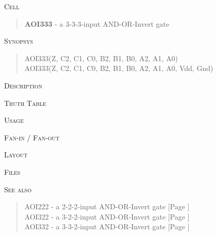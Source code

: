 
\label{AOI333}
\textsc{Cell}
\begin{quote}
    \textbf{AOI333} - a 3-3-3-input AND-OR-Invert gate
\end{quote}

\textsc{Synopsys}
\begin{quote}
    AOI333(Z, C2, C1, C0, B2, B1, B0, A2, A1, A0) \\
    AOI333(Z, C2, C1, C0, B2, B1, B0, A2, A1, A0, Vdd, Gnd)
\end{quote}

\textsc{Description}

%

\textsc{Truth Table}


\textsc{Usage}

\textsc{Fan-in / Fan-out}

\textsc{Layout}

\textsc{Files}

\textsc{See also}
\begin{quote}
    AOI222 - a 2-2-2-input AND-OR-Invert gate [Page \pageref{AOI222}] \\
    AOI322 - a 3-2-2-input AND-OR-Invert gate [Page \pageref{AOI322}] \\
    AOI332 - a 3-3-2-input AND-OR-Invert gate [Page \pageref{AOI332}]
\end{quote}
